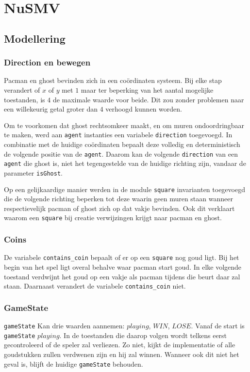 \documentclass[a4paper,12pt]{article}
\begin{document}
\section{NuSMV}

\subsection{Modellering}

\subsubsection{Direction en bewegen}
Pacman en ghost bevinden zich in een co\"ordinaten systeem.
Bij elke stap verandert of $ x $ of $ y $ met $ 1 $
maar ter beperking van het aantal mogelijke toestanden, is $ 4 $ de maximale waarde voor beide.
Dit zou zonder problemen naar een willekeurig getal groter dan $ 4 $ verhoogd kunnen worden.

Om te voorkomen dat ghost rechtsomkeer maakt, 
en om muren ondoordringbaar te maken,
werd aan \texttt{agent} instanties een variabele \texttt{direction} toegevoegd.
In combinatie met de huidige co\"ordinaten bepaalt deze volledig en deterministisch de volgende positie van de \texttt{agent}.
Daarom kan de volgende \texttt{direction} van een \texttt{agent} die ghost is,
niet het tegengestelde van de huidige richting zijn, vandaar de parameter \texttt{isGhost}.

Op een gelijkaardige manier werden in de module \texttt{square} invarianten toegevoegd
die de volgende richting beperken tot deze waarin geen muren staan
wanneer respectievelijk pacman of ghost zich op dat vakje bevinden.
Ook dit verklaart waarom een \texttt{square} bij creatie verwijzingen krijgt naar pacman en ghost.

\subsubsection{Coins}
De variabele \texttt{contains\_coin} bepaalt of er op een \texttt{square} nog goud ligt.
Bij het begin van het spel ligt overal behalve waar pacman start goud.
In elke volgende toestand verdwijnt het goud op een vakje als pacman tijdens die beurt daar zal staan.
Daarnaast verandert de variabele \texttt{contains\_coin} niet.

\subsubsection{GameState}
\texttt{gameState} Kan drie waarden aannemen: $ playing $, $ WIN $, $ LOSE $.
Vanaf de start is \texttt{gameState} $ playing $.
In de toestanden die daarop volgen wordt telkens eerst gecontroleerd of de speler zal verliezen.
Zo niet, kijkt de implementatie of alle goudstukken zullen verdwenen zijn en hij zal winnen.
Wanneer ook dit niet het geval is, blijft de huidige \texttt{gameState} behouden.
\end{document}
